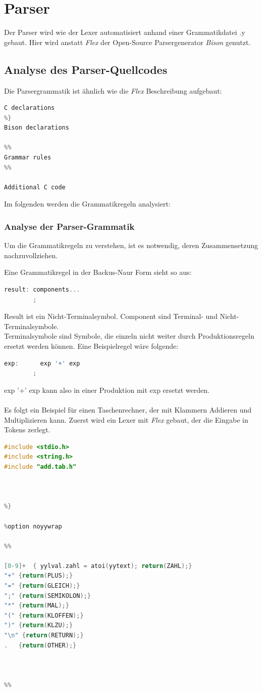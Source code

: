 \documentclass[11pt]{report}
\begin{document}
\chapter{Parser}

Der Parser wird wie der Lexer automatisiert anhand einer Grammatikdatei .y gebaut. Hier wird anstatt \textit{Flex} der Open-Source Parsergenerator \textit{Bison} genutzt.
\section{Analyse des Parser-Quellcodes}
Die Parsergrammatik ist ähnlich wie die \textit{Flex} Beschreibung aufgebaut:
\begin{lstlisting}[language=C++]
%{
C declarations
%}
Bison declarations

%%
Grammar rules
%%

Additional C code
\end{lstlisting}

Im folgenden werden die Grammatikregeln analysiert:
\subsection{Analyse der Parser-Grammatik}
Um die Grammatikregeln zu verstehen, ist es notwendig, deren Zusammensetzung nachzuvollziehen.

Eine Grammatikregel in der Backus-Naur Form sieht so aus:

\begin{lstlisting}[language=C++]
result: components...
        ;
\end{lstlisting}
Result ist ein Nicht-Terminalsymbol. Component sind Terminal- und Nicht-Terminalsymbole.\\
Terminalsymbole sind Symbole, die einzeln nicht weiter durch Produktionsregeln ersetzt werden können.
Eine Beispielregel wäre folgende:

  \begin{lstlisting}[language=C++]
  	exp:      exp '+' exp
        ;

  \end{lstlisting}

exp '+' exp kann also in einer Produktion mit exp ersetzt werden.
\\
\\
Es folgt ein Beispiel für einen Taschenrechner, der mit Klammern Addieren und Multiplizieren kann.
Zuerst wird ein Lexer mit \textit{Flex} gebaut, der die Eingabe in Tokens zerlegt.
\begin{lstlisting}[language=C++]
%{
#include <stdio.h>
#include <string.h>
#include "add.tab.h"



%}

%option noyywrap

%%

[0-9]+  { yylval.zahl = atoi(yytext); return(ZAHL);}
"+" {return(PLUS);}
"=" {return(GLEICH);}
";" {return(SEMIKOLON);}
"*" {return(MAL);}
"(" {return(KLOFFEN);}
")" {return(KLZU);}
"\n" {return(RETURN);}
.   {return(OTHER);}



%%
\end{lstlisting}
\end{document}
